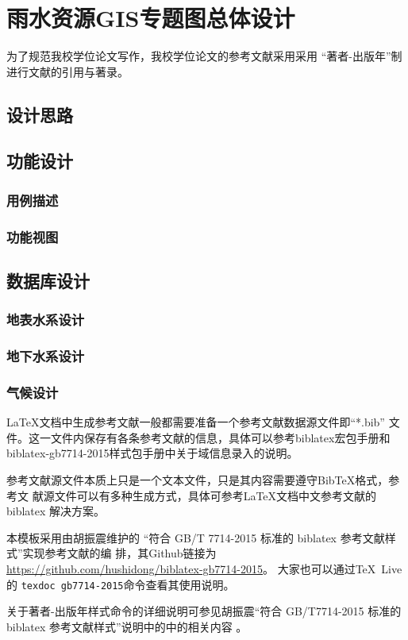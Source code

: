 \chapter{雨水资源GIS专题图总体设计}

为了规范我校学位论文写作，我校学位论文的参考文献采用采用
\enquote{著者-出版年}制进行文献的引用与著录。

\section{设计思路}
\section{功能设计}
\subsection{用例描述}
\subsection{功能视图}

\section{数据库设计}
\subsection{地表水系设计}
\subsection{地下水系设计}
\subsection{气候设计}
\LaTeX 文档中生成参考文献一般都需要准备一个参考文献数据源文件即\enquote{*.bib}
文件。这一文件内保存有各条参考文献的信息，具体可以参考biblatex宏包手册和
biblatex-gb7714-2015样式包手册\cite{胡振震2019}中关于域信息录入的说明。

参考文献源文件本质上只是一个文本文件，只是其内容需要遵守BibTeX格式，参考文
献源文件可以有多种生成方式，具体可参考\LaTeX{}文档中文参考文献的biblatex 
解决方案\parencite[2.2节]{胡振震2016}。

本模板采用由胡振震维护的
\enquote{符合 GB/T 7714-2015 标准的 biblatex 参考文献样式}实现参考文献的编
排\cite{胡振震2019}，其Github链接为
\url{https://github.com/hushidong/biblatex-gb7714-2015}。
大家也可以通过\TeX~Live的 \verb|texdoc gb7714-2015|命令查看其使用说明。

关于著者-出版年样式命令的详细说明可参见胡振震\enquote{符合 GB/T7714-2015 
标准的 biblatex 参考文献样式}说明中的中的相关内容
\parencite[2.2、2.3节]{胡振震2016}。



